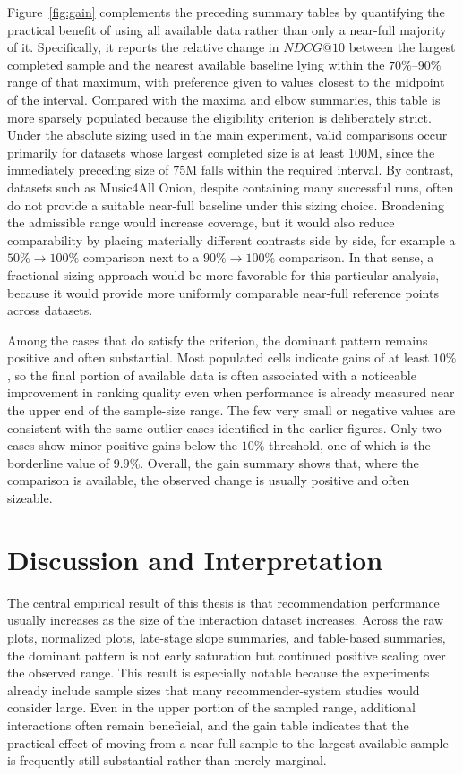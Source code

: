 \documentclass[12pt,a4paper]{article}
\begin{document}
Figure~\ref{fig:gain} complements the preceding summary tables by quantifying the practical benefit of using all available data rather than only a near-full majority of it. Specifically, it reports the relative change in $NDCG@10$ between the largest completed sample and the nearest available baseline lying within the $70\%$--$90\%$ range of that maximum, with preference given to values closest to the midpoint of the interval. Compared with the maxima and elbow summaries, this table is more sparsely populated because the eligibility criterion is deliberately strict. Under the absolute sizing used in the main experiment, valid comparisons occur primarily for datasets whose largest completed size is at least $100$M, since the immediately preceding size of $75$M falls within the required interval. By contrast, datasets such as Music4All Onion, despite containing many successful runs, often do not provide a suitable near-full baseline under this sizing choice. Broadening the admissible range would increase coverage, but it would also reduce comparability by placing materially different contrasts side by side, for example a $50\%\rightarrow100\%$ comparison next to a $90\%\rightarrow100\%$ comparison. In that sense, a fractional sizing approach would be more favorable for this particular analysis, because it would provide more uniformly comparable near-full reference points across datasets.

Among the cases that do satisfy the criterion, the dominant pattern remains positive and often substantial. Most populated cells indicate gains of at least $10\%$, so the final portion of available data is often associated with a noticeable improvement in ranking quality even when performance is already measured near the upper end of the sample-size range. The few very small or negative values are consistent with the same outlier cases identified in the earlier figures. Only two cases show minor positive gains below the $10\%$ threshold, one of which is the borderline value of $9.9\%$. Overall, the gain summary shows that, where the comparison is available, the observed change is usually positive and often sizeable.

\section{Discussion and Interpretation}
The central empirical result of this thesis is that recommendation performance usually increases as the size of the interaction dataset increases. Across the raw plots, normalized plots, late-stage slope summaries, and table-based summaries, the dominant pattern is not early saturation but continued positive scaling over the observed range. This result is especially notable because the experiments already include sample sizes that many recommender-system studies would consider large. Even in the upper portion of the sampled range, additional interactions often remain beneficial, and the gain table indicates that the practical effect of moving from a near-full sample to the largest available sample is frequently still substantial rather than merely marginal.
\end{document}
